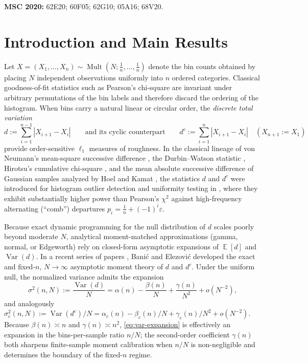 \documentclass[11pt,a4paper]{article}
\numberwithin{equation}{section}
\theoremstyle{plain}
\theoremstyle{definition}
\theoremstyle{remark}
\DeclareMathOperator{\E}{\mathbb{E}}
\DeclareMathOperator{\Var}{Var}
\DeclareMathOperator{\Mult}{Mult}
\begin{document}
\smallskip
\noindent\textbf{MSC 2020:} 62E20; 60F05; 62G10; 05A16; 68V20.

\tableofcontents

\section{Introduction and Main Results}
\label{sec:intro}

Let $X=(X_1,\dots,X_n)\sim\Mult(N;\tfrac{1}{n},\dots,\tfrac{1}{n})$ denote the bin counts obtained by placing $N$ independent observations uniformly into $n$ ordered categories. Classical goodness-of-fit statistics such as Pearson's chi-square are invariant under arbitrary permutations of the bin labels and therefore discard the ordering of the histogram. When bins carry a natural linear or circular order, the \emph{discrete total variation}
\[
  d := \sum_{i=1}^{n-1} |X_{i+1}-X_i|
  \qquad\text{and its cyclic counterpart}\qquad
  d^c := \sum_{i=1}^{n} |X_{i+1}-X_i| \quad (X_{n+1}:=X_1)
\]
provide order-sensitive $\ell_1$ measures of roughness. In the classical lineage of von Neumann's mean-square successive difference \cite{vonneumann1941}, the Durbin--Watson statistic \cite{durbin_watson1950}, Hirotsu's cumulative chi-square \cite{hirotsu1986}, and the mean absolute successive difference of Gaussian samples analyzed by Hoel \cite{hoel1946} and Kamat \cite{kamat1953}, the statistics $d$ and $d^c$ were introduced for histogram outlier detection and uniformity testing in \cite{banic_elezovic_tvor,banic_elezovic_ct}, where they exhibit substantially higher power than Pearson's $\chi^2$ against high-frequency alternating (``comb'') departures $p_i=\tfrac{1}{n}+(-1)^i\varepsilon$.

Because exact dynamic programming for the null distribution of $d$ scales poorly beyond moderate $N$, analytical moment-matched approximations (gamma, normal, or Edgeworth) rely on closed-form asymptotic expansions of $\E[d]$ and $\Var(d)$. In a recent series of papers \cite{banic_elezovic_p1,banic_elezovic_p2,banic_elezovic_p5}, Bani\'c and Elezovi\'c developed the exact and fixed-$n$, $N\to\infty$ asymptotic moment theory of $d$ and $d^c$. Under the uniform null, the normalized variance admits the expansion
\begin{equation}\label{eq:var-expansion}
  \sigma^2(n,N) := \frac{\Var(d)}{N}
  = \alpha(n) - \frac{\beta(n)}{N} + \frac{\gamma(n)}{N^2} + o(N^{-2}),
\end{equation}
and analogously $\sigma_c^2(n,N):=\Var(d^c)/N=\alpha_c(n)-\beta_c(n)/N+\gamma_c(n)/N^2+o(N^{-2})$. Because $\beta(n)\asymp n$ and $\gamma(n)\asymp n^2$, \eqref{eq:var-expansion} is effectively an expansion in the bins-per-sample ratio $n/N$; the second-order coefficient $\gamma(n)$ both sharpens finite-sample moment calibration when $n/N$ is non-negligible and determines the boundary of the fixed-$n$ regime.
\end{document}

